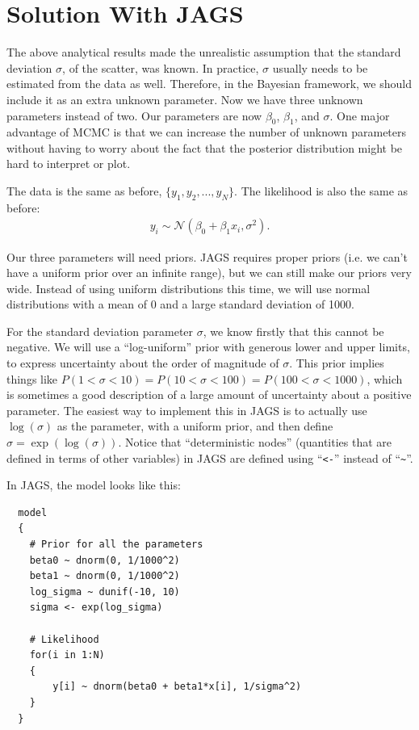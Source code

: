 \section{Solution With JAGS}
The above analytical results made the unrealistic assumption that the standard
deviation $\sigma$, of the scatter, was known. In practice, $\sigma$ usually needs to be
estimated from the data as well. Therefore, in the Bayesian framework, we should
include it as an extra unknown parameter. Now we have three unknown parameters instead
of two. Our parameters are now $\beta_0$, $\beta_1$, and $\sigma$.
One major advantage of MCMC is that we can increase the number of unknown parameters
without having to worry about the fact that the posterior distribution might
be hard to interpret or plot.

The data is the same as before, $\{y_1, y_2, ..., y_N\}$. The likelihood is
also the same as before:
\begin{eqnarray}
y_i \sim \mathcal{N}(\beta_0 + \beta_1 x_i, \sigma^2).
\end{eqnarray}

Our three parameters will need priors. JAGS requires proper priors (i.e. we
can't have a uniform prior over an infinite range), but we can still make our
priors very wide. Instead of using uniform distributions this time,
we will use normal distributions with a mean of 0 and a large standard deviation
of 1000.

For the standard deviation parameter $\sigma$, we know firstly that this cannot
be negative. We will use a ``log-uniform'' prior with generous lower and upper limits,
to express uncertainty about the order of magnitude of $\sigma$. This prior implies
things like $P(1 < \sigma < 10) = P(10 < \sigma < 100) = P(100 < \sigma < 1000)$,
which is sometimes a good description of a large amount of uncertainty about
a positive parameter. The easiest way to implement this in JAGS is to actually
use $\log(\sigma)$ as the parameter, with a uniform prior, and then define
$\sigma = \exp\left(\log(\sigma)\right)$. Notice that ``deterministic nodes''
(quantities that are defined in terms of other variables) in JAGS are defined
using ``{\tt <-}'' instead of ``{\tt \~{ }}''.

In JAGS, the model looks like this:
\begin{verbatim}
  model
  {
    # Prior for all the parameters
    beta0 ~ dnorm(0, 1/1000^2)
    beta1 ~ dnorm(0, 1/1000^2)
    log_sigma ~ dunif(-10, 10)
    sigma <- exp(log_sigma)

    # Likelihood
    for(i in 1:N)
    {
        y[i] ~ dnorm(beta0 + beta1*x[i], 1/sigma^2)
    }
  }
\end{verbatim}

